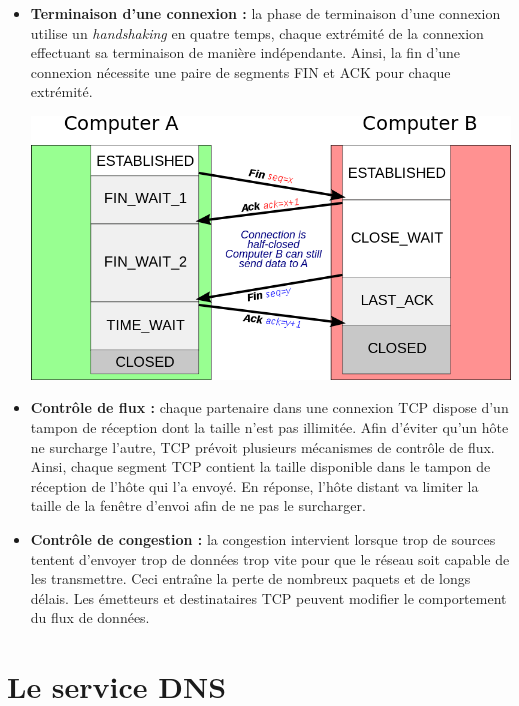 \documentclass[a4paper,9pt, twocolumn]{article}
\begin{document}
\begin{itemize}
		\item \textbf{Terminaison d'une connexion :}
			la phase de terminaison d'une connexion utilise un \emph{handshaking} en quatre temps, chaque extrémité de la connexion effectuant sa terminaison de manière indépendante.
			Ainsi, la fin d'une connexion nécessite une paire de segments FIN et ACK pour chaque extrémité.
			\begin{flushleft}
			\includegraphics[scale=0.27]{term.png}
			\end{flushleft}
		\item \textbf{Contrôle de flux :}
			chaque partenaire dans une connexion TCP dispose d'un tampon de réception dont la taille n'est pas illimitée.
			Afin d'éviter qu'un hôte ne surcharge l'autre, TCP prévoit plusieurs mécanismes de contrôle de flux.
			Ainsi, chaque segment TCP contient la taille disponible dans le tampon de réception de l'hôte qui l'a envoyé.
			En réponse, l'hôte distant va limiter la taille de la fenêtre d'envoi afin de ne pas le surcharger.
		\item \textbf{Contrôle de congestion :}
			la congestion intervient lorsque trop de sources tentent d'envoyer trop de données trop vite pour que le réseau soit capable de les transmettre. Ceci entraîne la perte de nombreux paquets et de longs délais. Les émetteurs et destinataires TCP peuvent modifier le comportement du flux de données.
	\end{itemize}


\section*{Le service DNS}
\end{document}
